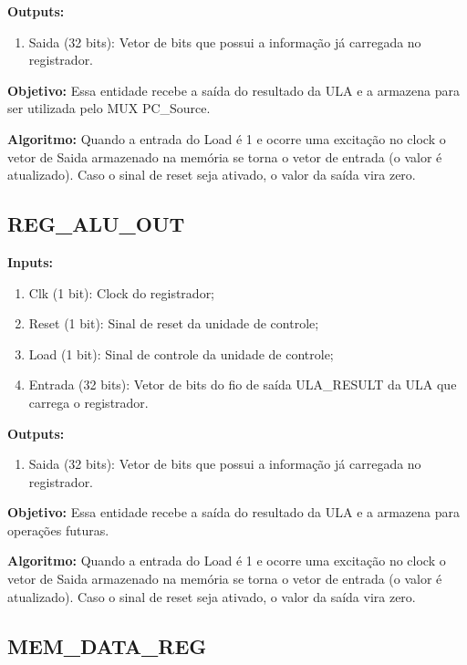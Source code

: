 \textbf{Outputs:}

\begin{enumerate}
    \item Saida (32 bits): Vetor de bits que possui a informação já carregada no registrador.
\end{enumerate}

\textbf{Objetivo:} Essa entidade recebe a saída do resultado da ULA e a armazena para ser utilizada pelo MUX PC\_Source.

\textbf{Algoritmo:} Quando a entrada do Load é 1 e ocorre uma excitação no clock o vetor de Saida armazenado na memória se torna o vetor de entrada (o valor é atualizado). Caso o sinal de reset seja ativado, o valor da saída vira zero.



\subsection{REG\_ALU\_OUT}

\textbf{Inputs:}

\begin{enumerate}
    \item Clk (1 bit): Clock do registrador;
    \item Reset (1 bit): Sinal de reset da unidade de controle;
    \item Load (1 bit): Sinal de controle da unidade de controle;
    \item Entrada (32 bits): Vetor de bits do fio de saída ULA\_RESULT da ULA que carrega o registrador.
    
\end{enumerate}

\textbf{Outputs:}

\begin{enumerate}
    \item Saida (32 bits): Vetor de bits que possui a informação já carregada no registrador.
\end{enumerate}

\textbf{Objetivo:} Essa entidade recebe a saída do resultado da ULA e a armazena para operações futuras.

\textbf{Algoritmo:} Quando a entrada do Load é 1 e ocorre uma excitação no clock o vetor de Saida armazenado na memória se torna o vetor de entrada (o valor é atualizado). Caso o sinal de reset seja ativado, o valor da saída vira zero.
\newpage

\subsection{MEM\_DATA\_REG}

